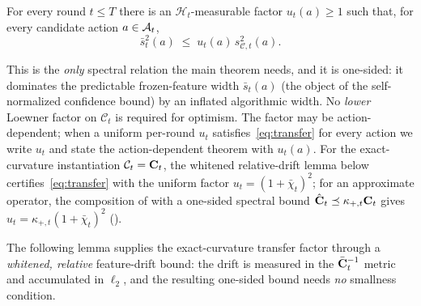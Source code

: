\documentclass[twoside]{article}
\newcommand{\Calg}{\mathcal{C}}                 %
\newcommand{\cHist}{\mathcal{H}}                %
\begin{document}
\begin{assumption}\label{asm:transfer}
For every round $t\le T$ there is an $\cHist_t$-measurable factor
$u_t(a)\ge 1$ such that, for every candidate action $a\in\mathcal{A}_t$,
\begin{equation}\label{eq:transfer}
  \bar s_t^2(a)\;\le\;u_t(a)\,s_{\Calg,t}^2(a).
\end{equation}
\end{assumption}

This is the \emph{only} spectral relation the main theorem needs, and it is
one-sided: it dominates the predictable frozen-feature width $\bar s_t(a)$
(the object of the self-normalized confidence bound) by an inflated
algorithmic width.  No \emph{lower} Loewner factor on $\Calg_t$ is required
for optimism.  The factor may be action-dependent; when a uniform per-round
$u_t$ satisfies~\eqref{eq:transfer} for every action we write $u_t$ and
state the action-dependent theorem with $u_t(a)$.
For the exact-curvature instantiation $\Calg_t=\bC_t$, the whitened
relative-drift lemma below certifies~\eqref{eq:transfer} with the uniform
factor $u_t=(1+\bar\chi_t)^2$; for an approximate operator, the composition
of  with a one-sided spectral bound
$\hat{\mathbf{C}}_t\preceq\kappa_{+,t}\mathbf{C}_t$ gives
$u_t=\kappa_{+,t}(1+\bar\chi_t)^2$ ().

The following lemma supplies the exact-curvature transfer factor through a
\emph{whitened, relative} feature-drift bound: the drift is measured in the
$\bar{\mathbf{C}}_t^{-1}$ metric and accumulated in $\ell_2$, and the resulting
one-sided bound needs \emph{no} smallness condition.
\end{document}
